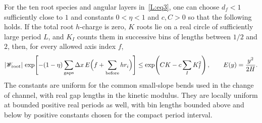 \begin{lemma}\label{L:lem:doubled-stability}
For the ten root species and angular layers in~\eqref{L:eq3}, one can
choose $d_f<1$ sufficiently close to $1$ and constants $0<\eta<1$ and $c,C>0$
so that the following holds. If the total root $h$-charge is zero,
$K$ roots lie on a real circle of sufficiently large period $L$, and
$K_I$ counts them in successive bins of lengths between $1/2$ and $2$,
then, for every allowed axis index $f$,
\[
 |\mathscr W_{\rm root}|\,
 \exp\!\left[-(1-\eta)\sum_{\rm gaps}
       \Delta x\,E\Bigl(f+\sum_{\rm before}hr_i\Bigr)\right]
 \le \exp\!\left(CK-c\sum_I K_I^2\right),
 \qquad E(y)=\frac{y^2}{2H}.
\]
The constants are uniform for the common small-slope bends used in the
change of channel, with real gap lengths in the kinetic modulus. They
are locally uniform at bounded positive real periods as well, with bin
lengths bounded above and below by positive constants chosen for the
compact period interval.
\end{lemma}

